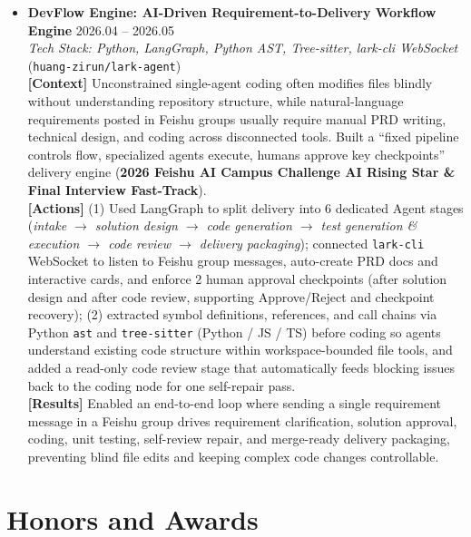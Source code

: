\documentclass[10pt,letterpaper]{article}
\begin{document}
\begin{itemize}[leftmargin=10pt]
  \item \textbf{DevFlow Engine: AI-Driven Requirement-to-Delivery Workflow Engine} \hfill 2026.04 -- 2026.05 \\
  \emph{Tech Stack: Python, LangGraph, Python AST, Tree-sitter, lark-cli WebSocket} (\texttt{huang-zirun/lark-agent}) \\
  \textbf{[Context]} Unconstrained single-agent coding often modifies files blindly without understanding repository structure, while natural-language requirements posted in Feishu groups usually require manual PRD writing, technical design, and coding across disconnected tools. Built a ``fixed pipeline controls flow, specialized agents execute, humans approve key checkpoints'' delivery engine (\textbf{2026 Feishu AI Campus Challenge AI Rising Star \& Final Interview Fast-Track}). \\
  \textbf{[Actions]} (1) Used LangGraph to split delivery into 6 dedicated Agent stages (\emph{intake $\rightarrow$ solution design $\rightarrow$ code generation $\rightarrow$ test generation \& execution $\rightarrow$ code review $\rightarrow$ delivery packaging}); connected \texttt{lark-cli} WebSocket to listen to Feishu group messages, auto-create PRD docs and interactive cards, and enforce 2 human approval checkpoints (after solution design and after code review, supporting Approve/Reject and checkpoint recovery); (2) extracted symbol definitions, references, and call chains via Python \texttt{ast} and \texttt{tree-sitter} (Python / JS / TS) before coding so agents understand existing code structure within workspace-bounded file tools, and added a read-only code review stage that automatically feeds blocking issues back to the coding node for one self-repair pass. \\
  \textbf{[Results]} Enabled an end-to-end loop where sending a single requirement message in a Feishu group drives requirement clarification, solution approval, coding, unit testing, self-review repair, and merge-ready delivery packaging, preventing blind file edits and keeping complex code changes controllable.
\end{itemize}

\section{Honors and Awards}
\end{document}

